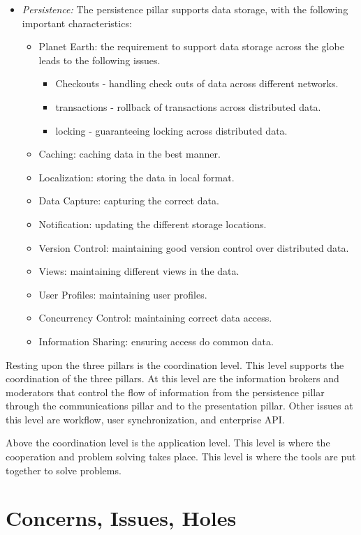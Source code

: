 \begin{itemize}
\item{\em Persistence:} The persistence pillar supports data storage, with
the following important characteristics:
  \begin{itemize}
  \item Planet Earth: the requirement to support data storage across the
    globe leads to the following issues.
    \begin{itemize}
    \item Checkouts - handling check outs of data across different networks.
    \item transactions - rollback of transactions across distributed data.
    \item locking - guaranteeing locking across distributed data.
    \end{itemize}
  \item Caching: caching data in the best manner.
  \item Localization: storing the data in local format.
  \item Data Capture: capturing the correct data.
  \item Notification: updating the different storage locations.
  \item Version Control: maintaining good version control over distributed data.
  \item Views: maintaining different views in the data.
  \item User Profiles: maintaining user profiles.
  \item Concurrency Control: maintaining correct data access.
  \item Information Sharing: ensuring access do common data.
  \end{itemize}
\end{itemize}

Resting upon the three pillars is the coordination level.  This level
supports the coordination of the three pillars.  At this level are the
information brokers and moderators that control the flow of information
from the persistence pillar through the communications pillar and to the
presentation pillar.  Other issues at this level are workflow, user
synchronization, and enterprise API.

Above the coordination level is the application level.  This level is where
the cooperation and problem solving takes place.  This level is where the
tools are put together to solve problems.

\section{Concerns, Issues, Holes}

